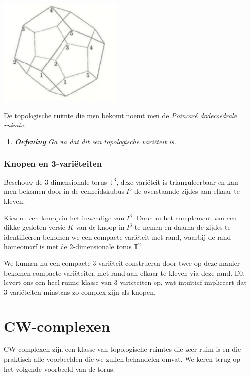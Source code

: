 \documentclass[12pt]{book}
\newtheorem{eoef}{$\!\!$}[chapter]
\newenvironment{oef}{\begin{eoef} {\bf Oefening}}{\end{eoef}}
\begin{document}
\begin{center}
\includegraphics[width=6cm]{images/pds.pdf}
\end{center}

De topologische ruimte die men bekomt noemt men de \emph{Poincar\'e dodeca\"edrale ruimte}.

\begin{oef}
Ga na dat dit een topologische vari\"eteit is.
\end{oef}

\subsubsection{Knopen en 3-vari\"eteiten}

Beschouw de 3-dimensionale torus $\mathbb{T}^3$, deze vari\"eteit is trianguleerbaar en kan men bekomen door in de eenheidskubus $I^3$ de overstaande zijdes aan elkaar te kleven. 

Kies nu een knoop in het inwendige van $I^3$.  Door nu het complement van een dikke gesloten versie $K$ van de knoop in $I^3$ te nemen en daarna de zijdes te identificeren bekomen we een compacte vari\"eteit met rand, waarbij de rand homeomorf is met de 2-dimensionale torus $\mathbb{T}^2$.

We kunnen nu een compacte 3-vari\"eteit construeren door twee op deze manier bekomen compacte vari\"eteiten met rand aan elkaar te kleven via deze rand. Dit levert ons een heel ruime klasse van 3-vari\"eteiten op, wat intu\"itief impliceert dat 3-vari\"eteiten minstens zo complex zijn als knopen.
 
 
\section{CW-complexen}\label{cw}
CW-complexen zijn een klasse van topologische ruimtes die zeer ruim is en die praktisch alle voorbeelden die we zullen behandelen omvat. We  keren terug op het volgende voorbeeld van de torus.
\end{document}

